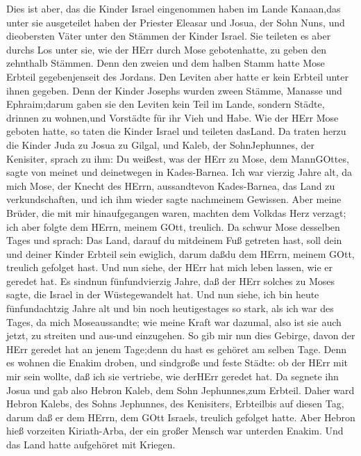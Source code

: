  Dies ist aber, das die Kinder Israel eingenommen haben im
Lande Kanaan,das unter sie ausgeteilet haben der Priester Eleasar und
Josua, der Sohn Nuns, und dieobersten Väter unter den Stämmen der Kinder
Israel.  Sie teileten es aber durchs Los unter sie, wie der
HErr durch Mose gebotenhatte, zu geben den zehnthalb Stämmen.
 Denn den zweien und dem halben Stamm hatte Mose Erbteil
gegebenjenseit des Jordans. Den Leviten aber hatte er kein Erbteil unter
ihnen gegeben.  Denn der Kinder Josephs wurden zween Stämme,
Manasse und Ephraim;darum gaben sie den Leviten kein Teil im Lande,
sondern Städte, drinnen zu wohnen,und Vorstädte für ihr Vieh und Habe.
 Wie der HErr Mose geboten hatte, so taten die Kinder Israel
und teileten dasLand.  Da traten herzu die Kinder Juda zu
Josua zu Gilgal, und Kaleb, der SohnJephunnes, der Kenisiter, sprach zu
ihm: Du weißest, was der HErr zu Mose, dem MannGOttes, sagte von meinet
und deinetwegen in Kades-Barnea.  Ich war vierzig Jahre alt,
da mich Mose, der Knecht des HErrn, aussandtevon Kades-Barnea, das Land
zu verkundschaften, und ich ihm wieder sagte nachmeinem Gewissen.
 Aber meine Brüder, die mit mir hinaufgegangen waren,
machten dem Volkdas Herz verzagt; ich aber folgte dem HErrn, meinem
GOtt, treulich.  Da schwur Mose desselben Tages und sprach:
Das Land, darauf du mitdeinem Fuß getreten hast, soll dein und deiner
Kinder Erbteil sein ewiglich, darum daßdu dem HErrn, meinem GOtt,
treulich gefolget hast.  Und nun siehe, der HErr hat mich
leben lassen, wie er geredet hat. Es sindnun fünfundvierzig Jahre, daß
der HErr solches zu Moses sagte, die Israel in der Wüstegewandelt hat.
Und nun siehe, ich bin heute fünfundachtzig Jahre alt  und
bin noch heutigestages so stark, als ich war des Tages, da mich
Moseaussandte; wie meine Kraft war dazumal, also ist sie auch jetzt, zu
streiten und aus-und einzugehen.  So gib mir nun dies
Gebirge, davon der HErr geredet hat an jenem Tage;denn du hast es
gehöret am selben Tage. Denn es wohnen die Enakim droben, und sindgroße
und feste Städte: ob der HErr mit mir sein wollte, daß ich sie
vertriebe, wie derHErr geredet hat.  Da segnete ihn Josua
und gab also Hebron Kaleb, dem Sohn Jephunnes,zum Erbteil. 
Daher ward Hebron Kalebs, des Sohns Jephunnes, des Kenisiters,
Erbteilbis auf diesen Tag, darum daß er dem HErrn, dem GOtt Israels,
treulich gefolget hatte.  Aber Hebron hieß vorzeiten
Kiriath-Arba, der ein großer Mensch war unterden Enakim. Und das Land
hatte aufgehöret mit Kriegen.


